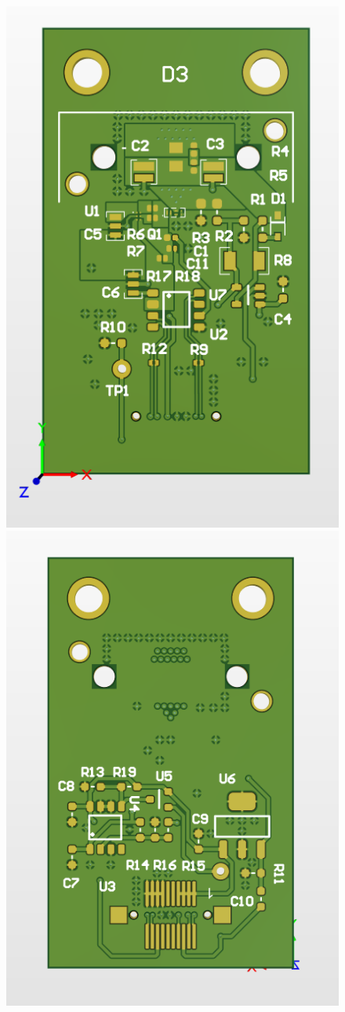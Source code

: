 \documentclass[a4paper,11pt]{article}
\begin{document}
\begin{figure}[htbp]
\centering
\includegraphics[scale=0.5]{PulserBoard0.93DTop.png}
\qquad
\includegraphics[scale=0.5]{PulserBoard0.93DBottom.png}

\end{figure}
\end{document}

